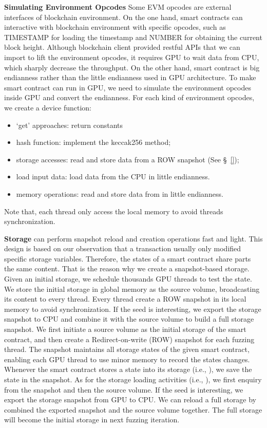 \noindent \textbf{Simulating Environment Opcodes}
Some EVM opcodes are external interfaces of blockchain environment.
On the one hand, smart contracts can interactive with blockchain environment with specific opcodes, such as TIMESTAMP for loading the timestamp and NUMBER for obtaining the current block height. Although blockchain client provided restful APIs that we can import to lift the environment opcodes, it requires GPU to wait data from CPU, which sharply decrease the {\tool} throughput.
%
On the other hand, smart contract is big endianness rather than the little endianness used in GPU architecture. 
To make smart contract can run in GPU, we need to simulate the environment opcodes inside GPU and convert the endianness. 
For each kind of environment opcodes, we create a device function:
\begin{itemize}
    \item `get' approaches: return constants
    \item hash function: implement the keccak256  method;
    \item storage accesses: read and store data from a ROW snapshot (See \S~\ref{});
    \item load input data: load data from the CPU in little endianness.
    \item memory operations: read and store data from  in little endianness.
\end{itemize}

Note that, each thread only access the local memory to avoid threads synchronization.

\noindent\textbf{Storage}
{\tool} can perform snapshot reload and creation operations fast and light. This design is based on our observation that a transaction usually only modified specific storage variables. Therefore, the states of a smart contract share parts the same content. That is the reason why we create a snapshot-based storage. 
Given an initial storage, we schedule thousands GPU threads to test the state. We store the initial storage in global memory as the source volume, broadcasting its content to every thread. Every thread create a ROW snapshot in its local memory to avoid synchronization. If the seed is interesting, we export the storage snapshot to CPU and combine it with the source volume to build a full storage snapshot.   
%
We first initiate a source volume as the initial storage of the smart contract, and then create a Redirect-on-write (ROW) snapshot for each fuzzing thread. The snapshot maintains all storage states of the given smart contract, enabling each GPU thread to use minor memory to record the states changes. 
Whenever the smart contract stores a state into its storage (i.e., ), we save the state in the snapshot. As for the storage loading activities (i.e., ), we first enquiry from the snapshot and then the source volume. 
If the seed is interesting, we export the storage snapshot from GPU to CPU. 
We can reload a full storage by combined the exported snapshot and the source volume together. The full storage will become the initial storage in next fuzzing iteration.